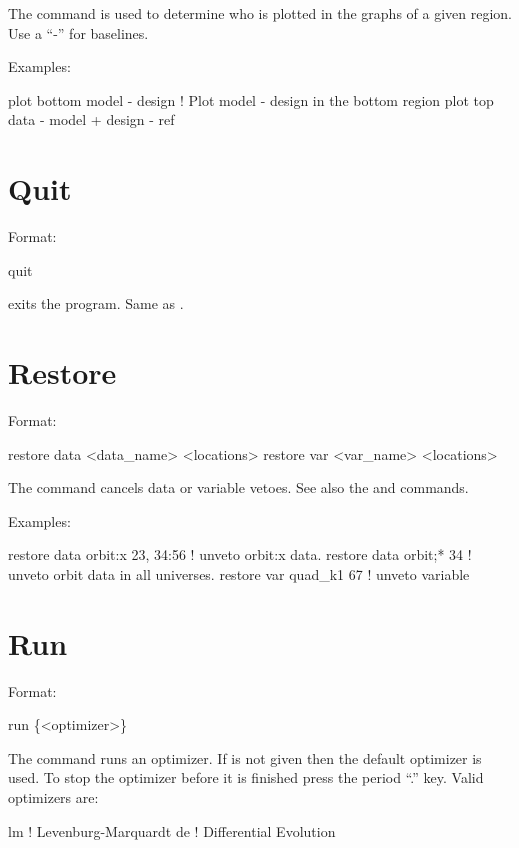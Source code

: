\vskip 0.2in The  command is used to determine who is plotted
in the graphs of a given region. Use a ``-'' for baselines. 

Examples:
\begin{example}
  plot bottom model - design       ! Plot model - design in the bottom region
  plot top data - model + design - ref 
\end{example}

\section{Quit}
\label{s:quit}

Format:
\begin{example}
  quit
\end{example}

\vskip 0.2in
 exits the program. Same as .

\section{Restore}
\label{s:restore}

Format:
\begin{example}
  restore data  <data_name> <locations>
  restore var <var_name> <locations>
\end{example}

\vskip 0.2in 
The  command cancels data or variable
vetoes. See also the 
and  commands.

Examples:
\begin{example}
  restore data orbit:x  23, 34:56 ! unveto orbit:x data.
  restore data orbit;* 34         ! unveto orbit data in all universes.
  restore var quad_k1 67          ! unveto variable
\end{example}


\section{Run}
\label{s:run}

Format:
\begin{example}
  run \{<optimizer>\}
\end{example}

\vskip 0.2in The  command runs an optimizer. If
 is not given then the default optimizer is used. To
stop the optimizer before it is finished press the period ``.'' key.
Valid optimizers are:
\begin{example}
  lm            ! Levenburg-Marquardt
  de            ! Differential Evolution
\end{example}

